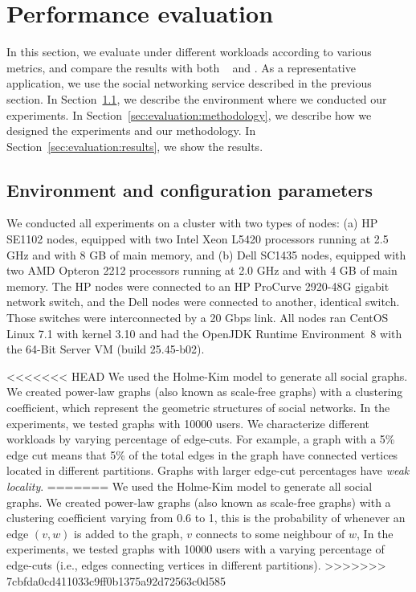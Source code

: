 \section{Performance evaluation}
\label{sec:experiments}

In this section, we evaluate \dynastar{} under different workloads
according to various metrics, and compare the results with both
\ssmr{}~\cite{bezerra2014ssmr} and \dssmr. As a representative
application, we use the \appname{} social networking service described in the
previous section. In Section~\ref{sec:evaluation:setup}, we
describe the environment where we conducted our experiments.  In
Section~\ref{sec:evaluation:methodology}, we describe how we designed
the experiments and our methodology.  In
Section~\ref{sec:evaluation:results}, we show the results.

\subsection{Environment and configuration parameters}
\label{sec:evaluation:setup}

We conducted all experiments on a cluster with two types of nodes: (a)
HP SE1102 nodes, equipped with two Intel Xeon L5420 processors running
at 2.5 GHz and with 8 GB of main memory, and (b) Dell SC1435 nodes,
equipped with two AMD Opteron 2212 processors running at 2.0 GHz and
with 4 GB of main memory. The HP nodes were connected to an HP
ProCurve 2920-48G gigabit network switch, and the Dell nodes were
connected to another, identical switch. Those switches were
interconnected by a 20 Gbps link.  All nodes ran CentOS Linux 7.1 with
kernel 3.10 and had the OpenJDK Runtime Environment~8 with the
\mbox{64-Bit} Server VM (build 25.45-b02).

<<<<<<< HEAD
We used the Holme-Kim model \cite{holme-kim} to generate all social
graphs.  We created power-law graphs (also known as scale-free graphs)
with a clustering coefficient, which represent the geometric
structures of social networks.  In the experiments, we tested graphs
with 10000 users. We characterize different workloads by varying percentage of edge-cuts.
For example, a graph with a 5\% edge cut means that 5\% of the total edges
in the graph have connected vertices located in different partitions.
Graphs with larger edge-cut percentages have \emph{weak locality}.
=======
We used the Holme-Kim model \cite{holme-kim} to generate all social graphs.
We created power-law graphs (also known as scale-free graphs) with a clustering coefficient varying from 0.6 to 1, 
this is the probability of whenever an edge $(v, w)$ is added to the graph, $v$ connects to some neighbour of $w$, 
In the experiments, we tested graphs with 10000 users with a varying percentage of edge-cuts (i.e., edges connecting vertices in different partitions).
>>>>>>> 7cbfda0cd411033c9ff0b1375a92d72563c0d585

